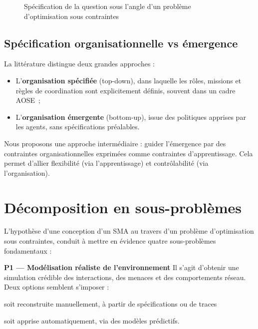 \begin{figure}[H]
  \centering
  \resizebox{\textwidth}{!}{%
    
  }
  \caption{Spécification de la question sous l'angle d'un problème d'optimisation sous contraintes}
  \label{fig:constrained_optimization_overview}
\end{figure}

\subsection{Spécification organisationnelle vs émergence}

La littérature distingue deux grandes approches :
\begin{itemize}
  \item L’\textbf{organisation spécifiée} (top-down), dans laquelle les rôles, missions et règles de coordination sont explicitement définis, souvent dans un cadre AOSE~;
  \item L’\textbf{organisation émergente} (bottom-up), issue des politiques apprises par les agents, sans spécifications préalables.
\end{itemize}

Nous proposons une approche intermédiaire : guider l’émergence par des contraintes organisationnelles exprimées comme contraintes d’apprentissage. Cela permet d’allier flexibilité (via l’apprentissage) et contrôlabilité (via l’organisation).

\section{Décomposition en sous-problèmes}

L'hypothèse d'une conception d'un SMA au travers d'un problème d'optimisation sous contraintes, conduit à mettre en évidence quatre sous-problèmes fondamentaux :

\medskip
\noindent
\textbf{P1 — Modélisation réaliste de l’environnement}
Il s’agit d’obtenir une simulation crédible des interactions, des menaces et des comportements réseau. Deux options semblent s'imposer :
\begin{enumerate*}[label={\roman*) },itemjoin={~; \quad}]
  \item soit reconstruite manuellement, à partir de spécifications ou de traces
  \item soit apprise automatiquement, via des modèles prédictifs.
\end{enumerate*}

